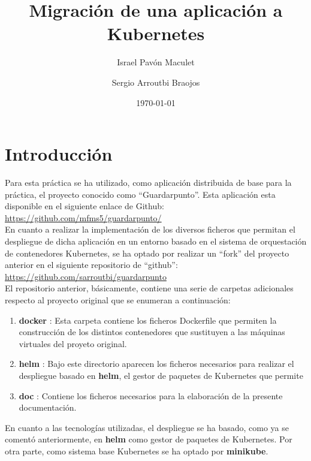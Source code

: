 \documentclass[12pt,spanish]{article}
\title{\textbf{Migración de una aplicación a Kubernetes}}
\author{Israel Pavón Maculet\\
  \and
  Sergio Arroutbi Braojos}
\date{\today}
\begin{document}
\maketitle

\tableofcontents

\listoffigures

\section{Introducción}

Para esta práctica se ha utilizado, como aplicación distribuida de base para la práctica, el proyecto conocido como ``Guardarpunto''. Esta aplicación esta disponible en el siguiente enlace de Github:\\

\url{https://github.com/mfms5/guardarpunto/}\\

En cuanto a realizar la implementación de los diversos ficheros que permitan el despliegue de dicha aplicación en un entorno basado en el sistema de orquestación de contenedores Kubernetes, se ha optado por realizar un ``fork'' del proyecto anterior en el siguiente repositorio de ``github'':\\

\url{https://github.com/sarroutbi/guardarpunto}\\

El repositorio anterior, básicamente, contiene una serie de carpetas adicionales respecto al proyecto original que se enumeran a continuación:

\begin{enumerate}
\item{\textbf{docker} :} Esta carpeta contiene los ficheros Dockerfile que permiten la construcción de los distintos contenedores que sustituyen a las máquinas virtuales del proyeto original.
\item{\textbf{helm} :} Bajo este directorio aparecen los ficheros necesarios para realizar el despliegue basado en \textbf{helm}, el gestor de paquetes de Kubernetes que permite
\item{\textbf{doc} :} Contiene los ficheros necesarios para la elaboración de la presente documentación.
\end{enumerate}

En cuanto a las tecnologías utilizadas, el despliegue se ha basado, como ya se comentó anteriormente, en \textbf{helm} como gestor de paquetes de Kubernetes. Por otra parte, como sistema base Kubernetes se ha optado por \textbf{minikube}.
\end{document}
